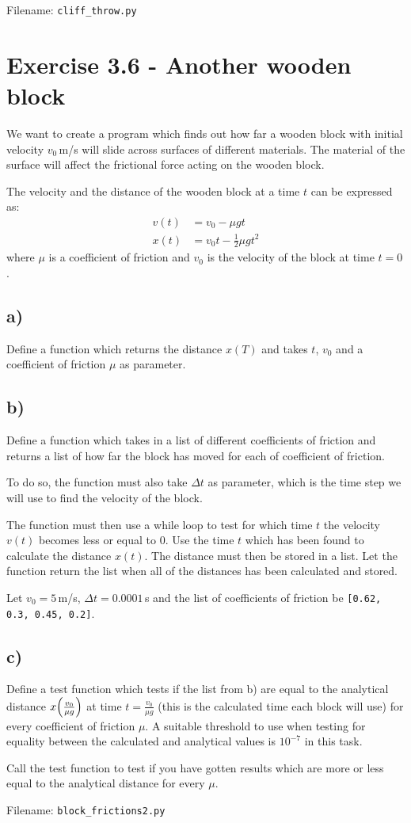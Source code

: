 \documentclass[10pt,a4paper]{article}
\begin{document}
Filename: \texttt{cliff\_throw.py}




\section*{Exercise 3.6 - Another wooden block}
	We want to create a program which finds out how far a wooden block with initial velocity $v_0\,$m/s will slide across surfaces of different materials. The material of the surface will affect the frictional force acting on the wooden block. 
	
	The velocity and the distance of the wooden block at a time $t$ can be expressed as:
\begin{align*}
v(t) &= v_0 -  \mu g t \\
x(t) &= v_0t - \frac{1}{2}\mu g t^2
\end{align*}
where $\mu$ is a coefficient of friction and $v_0$ is the velocity of the block at time $t = 0$. 

\subsection*{a)}
Define a function which returns the distance $x(T)$ and takes $t$, $v_0$ and a coefficient of friction $\mu$ as parameter. 

\subsection*{b)}

Define a function which takes in a list of different coefficients of friction and returns a list of how far the block has moved for each of coefficient of friction. 

To do so, the function must also take $\Delta t$ as parameter, which is the time step we will use to find the velocity of the block. 

The function must then use a while loop to test for which time $t$ the velocity $v(t)$ becomes less or equal to 0. Use the time $t$ which has been found to calculate the distance $x(t)$. The distance must then be stored in a list. Let the function return the list when all of the distances has been calculated and stored. 

Let $v_0 = 5\,$m/s, $\Delta t = 0.0001\,$s and the list of coefficients of friction be \texttt{[0.62, 0.3, 0.45, 0.2]}.
\subsection*{c)}
Define a test function which tests if the list from b) are equal to the analytical distance $x\qty(\frac{v_0}{\mu g})$ at time $t = \frac{v_0}{\mu g}$ (this is the calculated time each block will use) for every coefficient of friction $\mu$. A suitable threshold to use when testing for equality between the calculated and analytical values is $10^{-7}$ in this task. 

Call the test function to test if you have gotten results which are more or less equal to the analytical distance for every $\mu$.  

Filename: \texttt{block\_frictions2.py}
\end{document}
